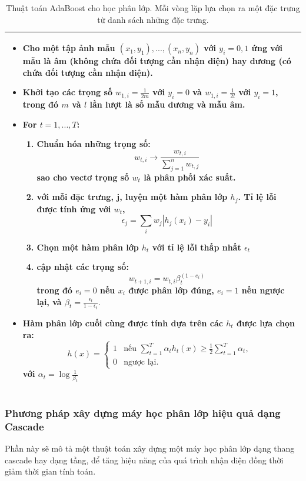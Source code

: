 \documentclass[14pt, oneside, a4paper, openany]{scrartcl}
\begin{document}
\begin{table}
\caption[Thuật toán AdaBoost cho học phân lớp]{Thuật toán AdaBoost cho học phân lớp. Mỗi vòng lặp lựa chọn ra một đặc trưng từ danh sách những đặc trưng.}
\begin{tabular}{ |m{15cm}| } 
	\hline
	\begin{itemize}
		\item Cho một tập ảnh mẫu $(x_1,y_1),...,(x_n,y_n)$ với $y_i=0,1$ ứng với mẫu là âm (không chứa đối tượng cần nhận diện) hay dương (có chứa đối tượng cần nhận diện).
		\item Khởi tạo các trọng số $w_{1,i}= \frac{1}{2m}$ với $y_i=0$ và $w_{1,i}= \frac{1}{2l}$ với $y_i=1$, trong đó $m$ và $l$ lần lượt là số mẫu dương và mẫu âm.
		\item For $t = 1,...,T$:
		\begin{enumerate}
			\item Chuẩn hóa những trọng số:
			$$
			w_{t,i} \rightarrow \frac{w_{t,i}}{\sum_{j=1}^{n}w_{t,j}}
			$$
			sao cho  vectơ trọng số $w_t$ là phân phối xác suất.
			\item với mỗi đặc trưng, j, luyện một hàm phân lớp $h_j$. Tỉ lệ lỗi được tính ứng với $w_t$,
			$$
			\epsilon_j = \sum_i w_j|h_j(x_i) - y_i|
			$$
			\item Chọn một hàm phân lớp $h_t$ với tỉ lệ lỗi thấp nhất $\epsilon_t$
			\item cập nhật các trọng số:
			$$
			w_{t+1,i} = w_{t,i} \beta_t^{(1-e_i)}
			$$
			trong đó $e_i=0$ nếu $x_i$ được phân lớp đúng, $e_i=1$ nếu ngược lại, và $\beta_t = \frac{\epsilon_t}{1 - \epsilon_t}.$
		\end{enumerate}
		\item Hàm phân lớp cuối cùng được tính dựa trên các $h_t$ được lựa chọn ra:
		$$
		h(x)=
		\begin{cases}
			1& \text{nếu $\sum_{t=1}^{T}\alpha_t h_t(x) \geq \frac{1}{2}\sum_{t=1}^{T}\alpha_t$},\\
			0& \text{ngược lại}.
		\end{cases}
		$$
		với $\alpha_t = \log\frac{1}{\beta_t}$
	\end{itemize}
	\\
	\hline
\end{tabular}
\end{table}

\subsubsection{Phương pháp xây dựng máy học phân lớp hiệu quả dạng Cascade}
Phần này sẽ mô tả một thuật toán xây dựng một máy học phân lớp dạng thang cascade hay dạng tầng, để tăng hiệu năng của quá trình nhận diện đồng thời giảm thời gian tính toán.
\end{document}
